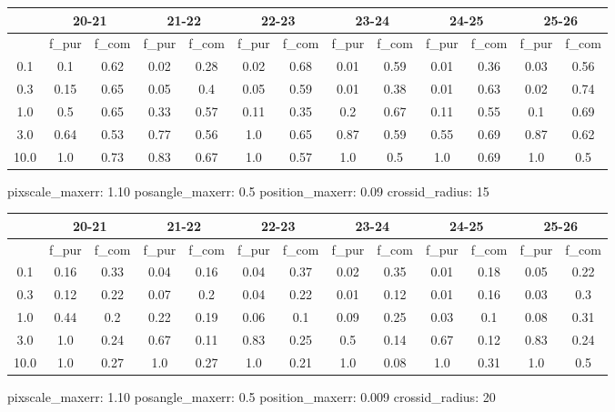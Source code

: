 \documentclass{article}
\begin{document}
\begin{figure}[H]
\centering
\begin{tabular}{|c|c|c|c|c|c|c|c|c|c|c|c|c|}
\hline
\multicolumn{1}{|c|}{} & \multicolumn{2}{|c|}{20-21} & \multicolumn{2}{|c|}{21-22} & \multicolumn{2}{|c|}{22-23} & \multicolumn{2}{|c|}{23-24} & \multicolumn{2}{|c|}{24-25} & \multicolumn{2}{|c|}{25-26}\\
\hline \hline
 & f\_pur & f\_com & f\_pur & f\_com & f\_pur & f\_com & f\_pur & f\_com & f\_pur & f\_com & f\_pur & f\_com \\
\hline
0.1 & 0.1 & 0.62 & 0.02 & 0.28 & 0.02 & 0.68 & 0.01 & 0.59 & 0.01 & 0.36 & 0.03 & 0.56\\
\hline
0.3 & 0.15 & 0.65 & 0.05 & 0.4 & 0.05 & 0.59 & 0.01 & 0.38 & 0.01 & 0.63 & 0.02 & 0.74\\
\hline
1.0 & 0.5 & 0.65 & 0.33 & 0.57 & 0.11 & 0.35 & 0.2 & 0.67 & 0.11 & 0.55 & 0.1 & 0.69\\
\hline
3.0 & 0.64 & 0.53 & 0.77 & 0.56 & 1.0 & 0.65 & 0.87 & 0.59 & 0.55 & 0.69 & 0.87 & 0.62\\
\hline
10.0 & 1.0 & 0.73 & 0.83 & 0.67 & 1.0 & 0.57 & 1.0 & 0.5 & 1.0 & 0.69 & 1.0 & 0.5\\
\hline
\end{tabular}
\caption{pixscale\_maxerr: 1.10 posangle\_maxerr: 0.5 position\_maxerr: 0.09 crossid\_radius: 15}
\end{figure}

\begin{figure}[H]
\centering
\begin{tabular}{|c|c|c|c|c|c|c|c|c|c|c|c|c|}
\hline
\multicolumn{1}{|c|}{} & \multicolumn{2}{|c|}{20-21} & \multicolumn{2}{|c|}{21-22} & \multicolumn{2}{|c|}{22-23} & \multicolumn{2}{|c|}{23-24} & \multicolumn{2}{|c|}{24-25} & \multicolumn{2}{|c|}{25-26}\\
\hline \hline
 & f\_pur & f\_com & f\_pur & f\_com & f\_pur & f\_com & f\_pur & f\_com & f\_pur & f\_com & f\_pur & f\_com \\
\hline
0.1 & 0.16 & 0.33 & 0.04 & 0.16 & 0.04 & 0.37 & 0.02 & 0.35 & 0.01 & 0.18 & 0.05 & 0.22\\
\hline
0.3 & 0.12 & 0.22 & 0.07 & 0.2 & 0.04 & 0.22 & 0.01 & 0.12 & 0.01 & 0.16 & 0.03 & 0.3\\
\hline
1.0 & 0.44 & 0.2 & 0.22 & 0.19 & 0.06 & 0.1 & 0.09 & 0.25 & 0.03 & 0.1 & 0.08 & 0.31\\
\hline
3.0 & 1.0 & 0.24 & 0.67 & 0.11 & 0.83 & 0.25 & 0.5 & 0.14 & 0.67 & 0.12 & 0.83 & 0.24\\
\hline
10.0 & 1.0 & 0.27 & 1.0 & 0.27 & 1.0 & 0.21 & 1.0 & 0.08 & 1.0 & 0.31 & 1.0 & 0.5\\
\hline
\end{tabular}
\caption{pixscale\_maxerr: 1.10 posangle\_maxerr: 0.5 position\_maxerr: 0.009 crossid\_radius: 20}
\end{figure}
\end{document}
